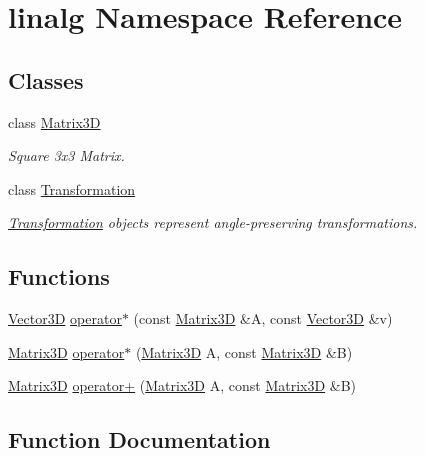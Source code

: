 \hypertarget{namespacelinalg}{}\section{linalg Namespace Reference}
\label{namespacelinalg}
\subsection*{Classes}
\begin{DoxyCompactItemize}
\item 
class \hyperlink{classlinalg_1_1Matrix3D}{Matrix3D}
\begin{DoxyCompactList}\small\item\em Square 3x3 Matrix. \end{DoxyCompactList}\item 
class \hyperlink{classlinalg_1_1Transformation}{Transformation}
\begin{DoxyCompactList}\small\item\em \hyperlink{classlinalg_1_1Transformation}{Transformation} objects represent angle-\/preserving transformations. \end{DoxyCompactList}\end{DoxyCompactItemize}
\subsection*{Functions}
\begin{DoxyCompactItemize}
\item 
\hyperlink{classVector3D}{Vector3D} \hyperlink{namespacelinalg_a64ac8620c880fd85e0163941dbd2ce92}{operator$\ast$} (const \hyperlink{classlinalg_1_1Matrix3D}{Matrix3D} \&A, const \hyperlink{classVector3D}{Vector3D} \&v)
\item 
\hyperlink{classlinalg_1_1Matrix3D}{Matrix3D} \hyperlink{namespacelinalg_a6bacae184309d12c829d272de83d0534}{operator$\ast$} (\hyperlink{classlinalg_1_1Matrix3D}{Matrix3D} A, const \hyperlink{classlinalg_1_1Matrix3D}{Matrix3D} \&B)
\item 
\hyperlink{classlinalg_1_1Matrix3D}{Matrix3D} \hyperlink{namespacelinalg_a556fef68037fa24314207620fa918536}{operator+} (\hyperlink{classlinalg_1_1Matrix3D}{Matrix3D} A, const \hyperlink{classlinalg_1_1Matrix3D}{Matrix3D} \&B)
\end{DoxyCompactItemize}


\subsection{Function Documentation}
